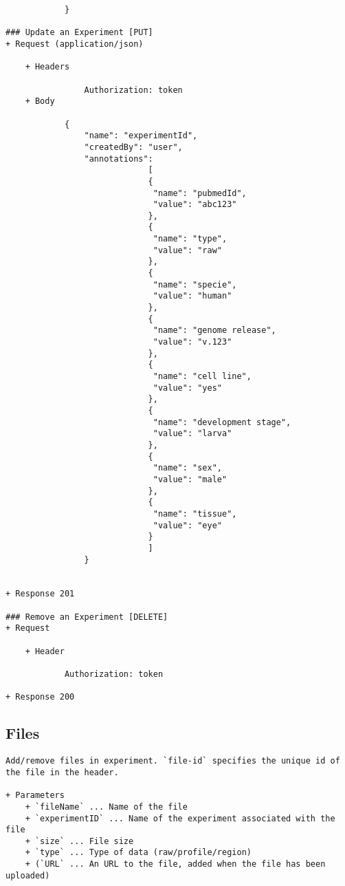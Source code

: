\begin{verbatim}
            }

### Update an Experiment [PUT]
+ Request (application/json)

    + Headers
    
                Authorization: token
    + Body 
    
            {
                "name": "experimentId",
                "createdBy": "user",
                "annotations": 
                             [
                             {
                              "name": "pubmedId",
                              "value": "abc123"
                             }, 
                             {
                              "name": "type",
                              "value": "raw"
                             },
                             {
                              "name": "specie",
                              "value": "human"
                             },
                             {
                              "name": "genome release",
                              "value": "v.123"
                             },
                             {
                              "name": "cell line",
                              "value": "yes"
                             },
                             {
                              "name": "development stage",
                              "value": "larva"
                             },
                             {
                              "name": "sex",
                              "value": "male"
                             },
                             {
                              "name": "tissue",
                              "value": "eye"
                             }
                             ]
                }
            
        
+ Response 201

### Remove an Experiment [DELETE]
+ Request 

    + Header
    
            Authorization: token
        
+ Response 200
\end{verbatim}

\subsection*{Files}
\begin{verbatim}
Add/remove files in experiment. `file-id` specifies the unique id of 
the file in the header. 

+ Parameters
    + `fileName` ... Name of the file
    + `experimentID` ... Name of the experiment associated with the file
    + `size` ... File size
    + `type` ... Type of data (raw/profile/region)
    + (`URL` ... An URL to the file, added when the file has been uploaded)
\end{verbatim}

